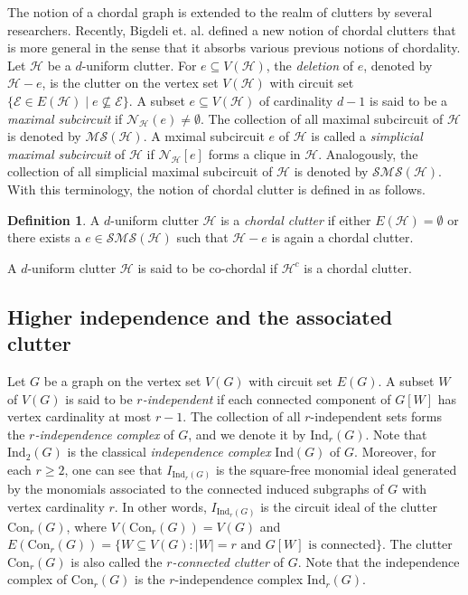 \documentclass[12pt,reqno]{amsart}
\theoremstyle{definition}
\newtheorem{definition}[proposition]{Definition}
\newcommand{\Con}{{\mathrm{Con}}}
\def\H{\mathcal{H}}
\def\E{\mathcal{E}}
\def\N{\mathcal{N}}
\def\SMS{\mathcal{SMS}}
\def\MS{\mathcal{MS}}
\def\Indr{\mathrm{Ind}_r(G)}
\begin{document}
The notion of a chordal graph is extended to the realm of clutters by several researchers. Recently, Bigdeli et. al. \cite{SBCC} defined a new notion of chordal clutters that is more general in the sense that it absorbs various previous notions of chordality. Let $\H$ be a $d$-uniform clutter. For $e\subseteq V(\H)$, the {\it deletion} of $e$, denoted by $\H - e$, is the clutter on the vertex set $V(\H)$ with circuit set $\{\E\in E(\H)\mid e\nsubseteq \E\}$. A subset $e\subseteq V(\H)$ of cardinality $d-1$ is said to be a {\it maximal subcircuit} if $\N_{\H}(e)\neq\emptyset$. The collection of all maximal subcircuit of $\H$ is denoted by $\MS(\H)$. A mximal subcircuit $e$ of $\H$ is called a {\it simplicial maximal subcircuit} of $\H$ if $\N_{\H}[e]$ forms a clique in $\H$. Analogously, the collection of all simplicial maximal subcircuit of $\H$ is denoted by $\SMS(\H)$. With this terminology, the notion of chordal clutter is defined in \cite{SBCC} as follows.
	
\begin{definition}
	A $d$-uniform clutter $\H$ is a {\it chordal clutter} if either $E(\H)=\emptyset$ or there exists a $e\in\SMS(\H)$ such that $\H - e$ is again a chordal clutter.

    A $d$-uniform clutter $\H$ is said to be co-chordal if $\H^c$ is a chordal clutter.
\end{definition}



	
	
	
\subsection{Higher independence and the associated clutter}
	
Let $G$ be a graph on the vertex set $V(G)$ with circuit set $E(G)$. A subset $W$ of $V(G)$ is said to be {\it $r$-independent} if each connected component of $G[W]$ has vertex cardinality at most $r-1$. The collection of all $r$-independent sets forms the {\it $r$-independence complex} of $G$, and we denote it by $\Indr$. Note that $\mathrm{Ind}_2(G)$ is the classical {\it independence complex} $\mathrm{Ind}(G)$ of $G$. Moreover, for each $r\ge 2$, one can see that $I_{\Indr}$ is the square-free monomial ideal generated by the monomials associated to the connected induced subgraphs of $G$ with vertex cardinality $r$. In other words, $I_{\Indr}$ is the circuit ideal of the clutter $\Con_r(G)$, where $V(\Con_r(G))=V(G)$ and $E(\Con_r(G))=\{W\subseteq V(G): |W|=r\text{ and } G[W]\text{ is connected}\}$. The clutter $\Con_r(G)$ is also called the {\it $r$-connected clutter} of $G$. Note that the independence complex of $\Con_r(G)$ is the $r$-independence complex $\Indr$. 
	
\end{document}
